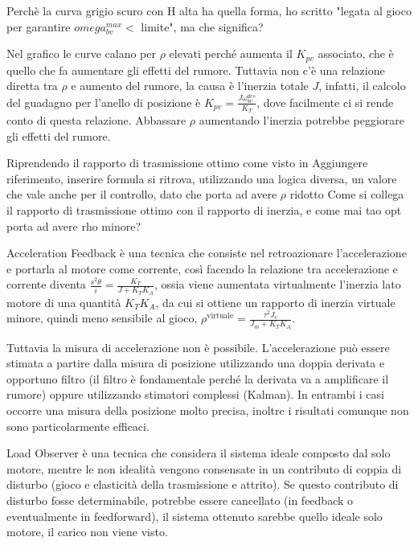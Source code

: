 {\color{red}Perchè la curva grigio scuro con H alta ha quella forma, ho scritto "legata al gioco per garantire \(omega_{bv}^{max}<\) limite", ma che significa?}

Nel grafico le curve calano per \(\rho\) elevati perché aumenta il \(K_{pv}\) associato, che è quello che fa aumentare gli effetti del rumore. Tuttavia non c'è una relazione diretta tra \(\rho\) e aumento del rumore, la causa è l'inerzia totale \(J\), infatti, il calcolo del guadagno per l'anello di posizione è \(K_{pv} = \frac{J \omega_{bv}^{des}}{K_T}\), dove facilmente ci si rende conto di questa relazione. Abbassare \(\rho\) aumentando l'inerzia potrebbe peggiorare gli effetti del rumore.

Riprendendo il rapporto di trasmissione ottimo come visto in {\color{red} Aggiungere riferimento, inserire formula} si ritrova, utilizzando una logica diversa, un valore che vale anche per il controllo, dato che porta ad avere \(\rho\) ridotto {\color{red}Come si collega il rapporto di trasmissione ottimo con il rapporto di inerzia, e come mai tao opt porta ad avere rho minore?}



Acceleration Feedback è una tecnica che consiste nel retroazionare l'accelerazione e portarla al motore come corrente, così facendo la relazione tra accelerazione e corrente diventa \(\frac{s^2\theta}{i} = \frac{K_T}{J + K_TK_A}\), ossia viene aumentata virtualmente l'inerzia lato motore di una quantità \(K_TK_A\), da cui si ottiene un rapporto di inerzia virtuale minore, quindi meno sensibile al gioco, \(\rho^\text{virtuale}=\frac{\tau^2 J_c}{J_m + K_TK_A}\).

Tuttavia la misura di accelerazione non è possibile. L'accelerazione può essere stimata a partire dalla misura di posizione utilizzando una doppia derivata e opportuno filtro (il filtro è fondamentale perché la derivata va a amplificare il rumore) oppure utilizzando stimatori complessi (Kalman). In entrambi i casi occorre una misura della posizione molto precisa, inoltre i risultati comunque non sono particolarmente efficaci.\label{misura_acc}



Load Observer è una tecnica che considera il sistema ideale composto dal solo motore, mentre le non idealità vengono consensate in un contributo di coppia di disturbo (gioco e elasticità della trasmissione e attrito).
Se questo contributo di disturbo fosse determinabile, potrebbe essere cancellato (in feedback o eventualmente in feedforward), il sistema ottenuto sarebbe quello ideale solo motore, il carico non viene visto.

